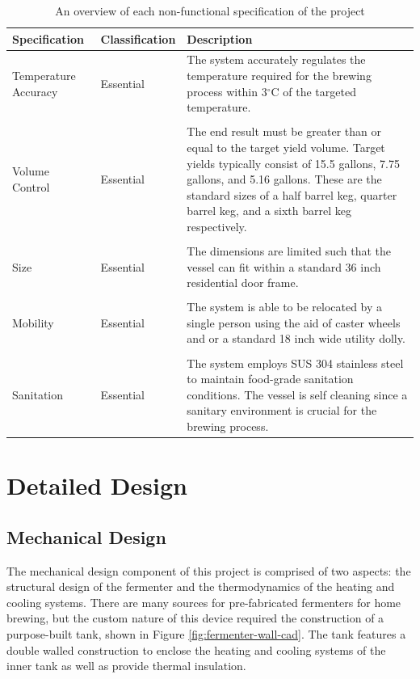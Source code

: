 \documentclass{article}
\begin{document}
\begin{table}[H]
\caption{An overview of each non-functional specification of the project}
\centering
\begin{tabularx}{\textwidth}{l l Z}
\toprule
\textbf{Specification} & \textbf{Classification} & \textbf{Description} \\ 
\midrule
Temperature Accuracy
& Essential
& The system accurately regulates the temperature required for the brewing process within 3$^{\circ}$C of the targeted temperature.
\\\\
Volume Control
& Essential
& The end result must be greater than or equal to the target yield volume.  Target yields typically consist of 15.5 gallons, 7.75 gallons, and 5.16 gallons.  These are the standard sizes of a half barrel keg, quarter barrel keg, and a sixth barrel keg respectively.
\\\\
Size
& Essential
& The dimensions are limited such that the vessel can fit within a standard 36 inch residential door frame.
\\\\
Mobility
& Essential
& The system is able to be relocated by a single person using the aid of caster wheels and or a standard 18 inch wide utility dolly.
\\\\
Sanitation
& Essential
& The system employs SUS 304 stainless steel to maintain food-grade sanitation conditions.  The vessel is self cleaning since a sanitary environment is crucial for the brewing process.
\\
\bottomrule
\end{tabularx}
\label{tab:non-func}
\end{table}
\pagebreak

\section{Detailed Design}
\subsection{Mechanical Design}
The mechanical design component of this project is comprised of two aspects: the structural design of the fermenter and the thermodynamics of the heating and cooling systems.  There are many sources for pre-fabricated fermenters for home brewing, but the custom nature of this device required the construction of a purpose-built tank, shown in Figure \ref{fig:fermenter-wall-cad}.  The tank features a double walled construction to enclose the heating and cooling systems of the inner tank as well as provide thermal insulation.
\end{document}
